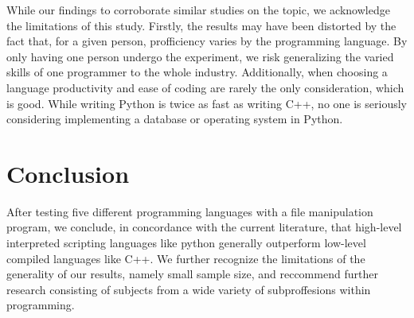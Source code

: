 \documentclass{article}
\begin{document}
While our findings to corroborate similar studies on the topic, we acknowledge the limitations of this study. Firstly, the results may have been distorted by the fact that, for a given person, profficiency varies by the programming language. By only having one person undergo the experiment, we risk generalizing the varied skills of one programmer to the whole industry. Additionally, when choosing a language productivity and ease of coding are rarely the only consideration, which is good. While writing Python is twice as fast as writing C++, no one is seriously considering implementing a database or operating system in Python.

\section{Conclusion}

After testing five different programming languages with a file manipulation program, we conclude, in concordance with the current literature, that high-level interpreted scripting languages like python generally outperform low-level compiled languages like C++. We further recognize the limitations of the generality of our results, namely small sample size, and reccommend further research consisting of subjects from a wide variety of subproffesions within programming.

\printbibliography
\end{document}
